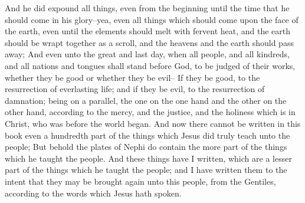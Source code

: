 And he did expound all things, even from the beginning until the time that he should come in his glory--yea, even all things which should come upon the face of the earth, even until the elements should melt with fervent heat, and the earth should be wrapt together as a scroll, and the heavens and the earth should pass away;
\bverse \iffalse And even unto the great and last day, when all people, and all kindreds, and all nations and tongues shall stand before God, to be judged of their works, whether they be good or whether they be evil-- \fi
And even unto the great and last day, when all people, and all kindreds, and all nations and tongues shall stand before God, to be judged of their works, whether they be good or whether they be evil--
\bverse \iffalse If they be good, to the resurrection of everlasting life; and if they be evil, to the resurrection of damnation; being on a parallel, the one on the one hand and the other on the other hand, according to the mercy, and the justice, and the holiness which is in Christ, who was before the world began. \fi
If they be good, to the resurrection of everlasting life; and if they be evil, to the resurrection of damnation; being on a parallel, the one on the one hand and the other on the other hand, according to the mercy, and the justice, and the holiness which is in Christ, who was before the world began.
\bverse \iffalse And now there cannot be written in this book even a hundredth part of the things which Jesus did truly teach unto the people; \fi
And now there cannot be written in this book even a hundredth part of the things which Jesus did truly teach unto the people;
\bverse \iffalse But behold the plates of Nephi do contain the more part of the things which he taught the people. \fi
But behold the plates of Nephi do contain the more part of the things which he taught the people.
\bverse \iffalse And these things have I written, which are a lesser part of the things which he taught the people; and I have written them to the intent that they may be brought again unto this people, from the Gentiles, according to the words which Jesus hath spoken. \fi
And these things have I written, which are a lesser part of the things which he taught the people; and I have written them to the intent that they may be brought again unto this people, from the Gentiles, according to the words which Jesus hath spoken.
\bverse \iffalse And when they shall have received this, which is expedient that they should have first, to try their faith, and if it shall so be that they shall believe these things then shall the greater things be made manifest unto them. \fi
